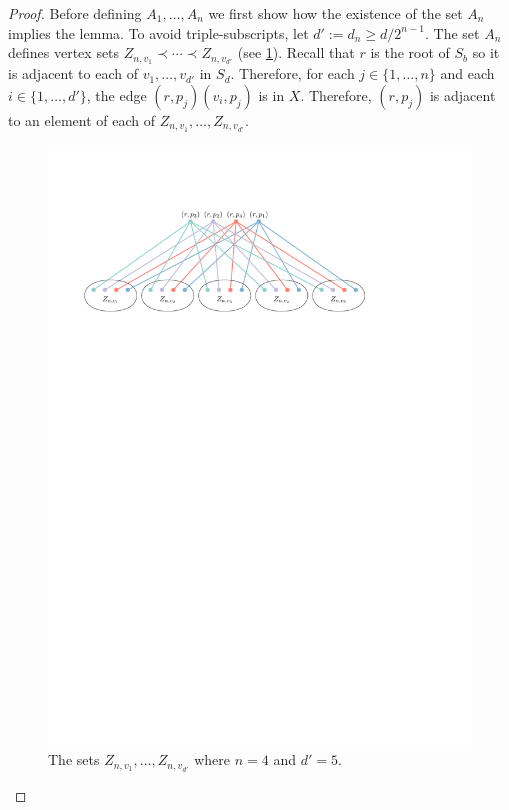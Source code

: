 \documentclass[kpfonts]{patmorin}
\renewcommand{\ge}{\geqslant}
\begin{document}
\begin{proof}
    Before defining $A_1,\ldots,A_n$ we first show how the existence of the set $A_n$ implies the lemma.  To avoid triple-subscripts, let $d':=d_n\ge d/2^{n-1}$.   The set $A_n$ defines vertex sets $Z_{n,v_1}\prec\cdots\prec Z_{n,v_{d'}}$ (see \cref{fig_twister}). Recall that $r$ is the root of $S_b$ so it is adjacent to each of $v_{1},\ldots,v_{d'}$ in $S_d$.  Therefore, for each $j\in\{1,\ldots,n\}$ and each $i\in\{1,\ldots,d'\}$, the edge $(r,p_j)(v_i,p_j)$ is in $X$. Therefore, $(r,p_j)$ is adjacent to an element of each of $Z_{n,v_1},\ldots,Z_{n,v_{d'}}$.
	\begin{figure}[!h]
		\centering\includegraphics{figs/twister}
		\caption{The sets $Z_{n,v_1},\ldots,Z_{n,v_{d'}}$ where $n=4$ and $d'=5$.}
		\label{fig_twister}
	\end{figure}


\end{proof}
\end{document}
